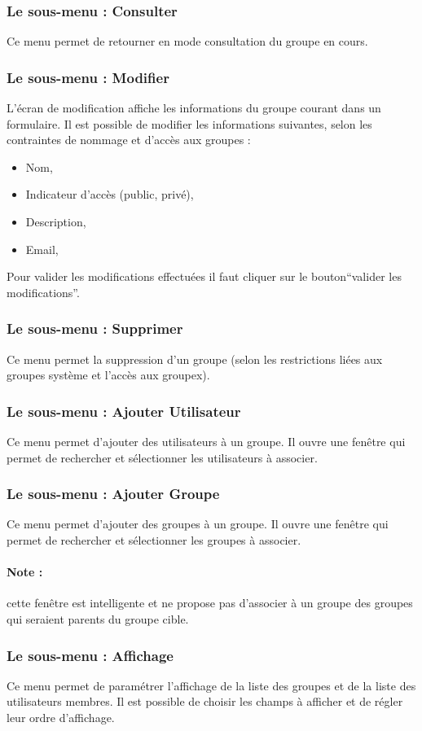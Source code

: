\subsubsection{Le sous-menu : Consulter}

Ce menu permet de retourner en mode consultation du groupe en cours.


\subsubsection{Le sous-menu : Modifier}

L'écran de modification affiche les informations du groupe courant dans un formulaire.
Il est possible de modifier les informations suivantes, selon les contraintes de nommage et d'accès aux groupes :

\begin{itemize}
\item Nom,
\item Indicateur d'accès (public, privé),
\item Description,
\item Email,
\end{itemize}

Pour valider les modifications effectuées il faut cliquer sur le bouton``valider les modifications''.


\subsubsection{Le sous-menu : Supprimer}
Ce menu permet la suppression d'un groupe (selon les restrictions liées aux groupes système et l'accès aux groupex).


\subsubsection{Le sous-menu : Ajouter Utilisateur}

Ce menu permet d'ajouter des utilisateurs à un groupe.
Il ouvre une fenêtre qui permet de rechercher et sélectionner les utilisateurs à associer.


\subsubsection{Le sous-menu : Ajouter Groupe}

Ce menu permet d'ajouter des groupes à un groupe.
Il ouvre une fenêtre qui permet de rechercher et sélectionner les groupes à associer.

\paragraph{Note :} cette fenêtre est intelligente et ne propose pas d'associer à un groupe des groupes qui seraient parents du groupe cible.


\subsubsection{Le sous-menu : Affichage}

Ce menu permet de paramétrer l'affichage de la liste des groupes et de la liste des utilisateurs membres. Il est possible de choisir les champs à afficher et de régler leur ordre d'affichage.
